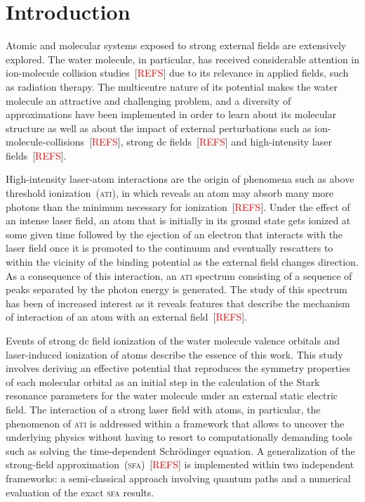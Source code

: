 \chapter{Introduction}
\label{cha:introduction}


Atomic and molecular systems exposed to strong external fields are
extensively explored.
The water molecule, in particular, has received considerable attention
in ion-molecule collision studies~[\textcolor{red}{REFS}] due to its
relevance in applied fields, such as radiation therapy. The
multicentre nature of its potential makes the water molecule an
attractive and challenging problem, and a diversity of approximations
have been implemented in order to learn about its molecular structure
as well as about the impact of external perturbations such as
ion-molecule-collisions~[\textcolor{red}{REFS}], strong dc
fields~[\textcolor{red}{REFS}] and high-intensity laser
fields~[\textcolor{red}{REFS}].

High-intensity laser-atom interactions are the origin of phenomena
such as above threshold ionization~(\textsc{ati}), in which reveals an
atom may absorb many more photons than the minimum necessary for
ionization~[\textcolor{red}{REFS}].
Under the effect of an intense laser field, an atom that is initially
in its ground state gets ionized at some given time followed by the
ejection of an electron that interacts with the laser field once it is
promoted to the continuum and eventually rescatters to within the
vicinity of the binding potential as the external field changes
direction. As a consequence of this interaction, an \textsc{ati}
spectrum consisting of a sequence of peaks separated by the photon
energy is generated. The study of this spectrum has been of increased
interest as it reveals features that describe the mechanism of
interaction of an atom with an external field~[\textcolor{red}{REFS}].

Events of strong dc field ionization of the water molecule valence
orbitals and laser-induced ionization of atoms describe the essence of
this work. This study involves deriving an effective potential that
reproduces the symmetry properties of each molecular orbital as an
initial step in the calculation of the Stark resonance parameters for
the water molecule under an external static electric field.
The interaction of a strong laser field with atoms, in particular, the
phenomenon of \textsc{ati} is addressed within a framework that allows
to uncover the underlying physics without having to resort to
computationally demanding tools such as solving the time-dependent
Schr\"{o}dinger equation. A generalization of the strong-field
approximation~(\textsc{sfa})~[\textcolor{red}{REFS}] is implemented
within two independent frameworks: a semi-classical approach involving
quantum paths and a numerical evaluation of the exact \textsc{sfa}
results.


